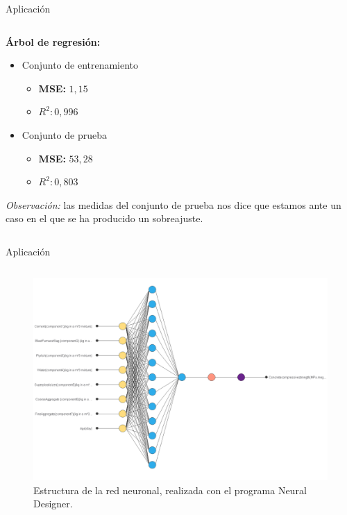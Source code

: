 \begin{frame}{Aplicación}
\begin{columns}
\begin{column}{0.9\textwidth}
\textbf{Árbol de regresión: }

\begin{itemize}
\item Conjunto de entrenamiento
\begin{itemize}
\item \textbf{MSE: }$1,15$
\item $R^2: 0,996$
\end{itemize}
\item Conjunto de prueba
\begin{itemize}
\item \textbf{MSE: }$53,28$
\item $R^2: 0,803$
\end{itemize}
\end{itemize}

\emph{Observación: }las medidas del conjunto de prueba nos dice que estamos ante un caso en el que se ha producido un sobreajuste. 
\end{column}
\end{columns}
\end{frame}

\begin{frame}{Aplicación}
\begin{columns}
\begin{column}{0.9\textwidth}
\begin{figure}[h]
  \centering
  \includegraphics[scale=0.25]{Documentos Extra/Imagenes/concrete archiquecture.png}
  \caption{Estructura de la red neuronal, realizada con el programa Neural Designer.}
  \label{fig:estructura red neuronal}
\end{figure}
  
\end{column}
\end{columns}
\end{frame}

